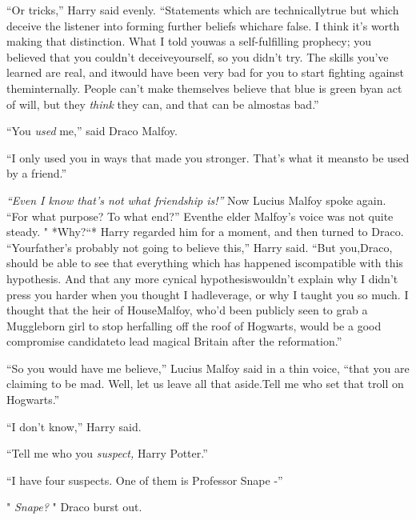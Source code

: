 ``Or tricks,'' Harry said evenly. ``Statements which are technicallytrue but which deceive the listener into forming further beliefs whichare false. I think it's worth making that distinction. What I told youwas a self-fulfilling prophecy; you believed that you couldn't deceiveyourself, so you didn't try. The skills you've learned are real, and itwould have been very bad for you to start fighting against theminternally. People can't make themselves believe that blue is green byan act of will, but they \emph{think} they can, and that can be almostas bad.''

``You \emph{used} me,'' said Draco Malfoy.

``I only used you in ways that made you stronger. That's what it meansto be used by a friend.''

\emph{``Even I know that's not what friendship is!''}
Now Lucius Malfoy spoke again. ``For what purpose? To what end?'' Eventhe elder Malfoy's voice was not quite steady. " *Why?``*
Harry regarded him for a moment, and then turned to Draco. ``Yourfather's probably not going to believe this,'' Harry said. ``But you,Draco, should be able to see that everything which has happened iscompatible with this hypothesis. And that any more cynical hypothesiswouldn't explain why I didn't press you harder when you thought I hadleverage, or why I taught you so much. I thought that the heir of HouseMalfoy, who'd been publicly seen to grab a Muggleborn girl to stop herfalling off the roof of Hogwarts, would be a good compromise candidateto lead magical Britain after the reformation.''

``So you would have me believe,'' Lucius Malfoy said in a thin voice,
``that you are claiming to be mad. Well, let us leave all that aside.Tell me who set that troll on Hogwarts.''

``I don't know,'' Harry said.

``Tell me who you \emph{suspect,} Harry Potter.''

``I have four suspects. One of them is Professor Snape -''

" \emph{Snape?} " Draco burst out.

